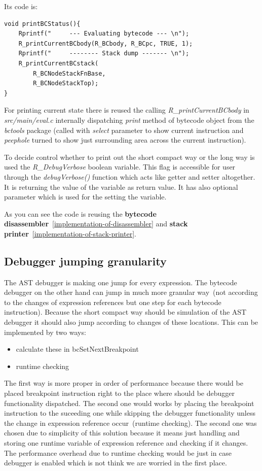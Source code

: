 \documentclass[thesis=M,english]{FITthesis}[2018/10/20]
\begin{document}
Its code is:
\begin{lstlisting}
void printBCStatus(){
    Rprintf("     --- Evaluating bytecode --- \n");
    R_printCurrentBCbody(R_BCbody, R_BCpc, TRUE, 1);
    Rprintf("     -------- Stack dump ------- \n");
    R_printCurrentBCstack(
    	R_BCNodeStackFnBase, 
    	R_BCNodeStackTop);
}
\end{lstlisting}

For printing current state there is reused the calling \textit{R{\_}printCurrentBCbody} in \textit{src/main/eval.c} internally dispatching \textit{print} method of bytecode object from the \textit{bctools} package (called with \textit{select} parameter to show current instruction and \textit{peephole} turned to show just surrounding area across the current instruction).

To decide control whether to print out the short compact way or the long way is used the \textit{R{\_}DebugVerbose} boolean variable. This flag is accessible for user through the \textit{debugVerbose()} function which acts like getter and setter altogether. It is returning the value of the variable as return value. It has also optional parameter which is used for the setting the variable. 

As you can see the code is reusing the \textbf{bytecode disassembler}~\ref{implementation-of-disassembler} and \textbf{stack printer}~\ref{implementation-of-stack-printer}.

\subsection{Debugger jumping granularity}\label{debugger-jumping-granuality}

The AST debugger is making one jump for every expression. The bytecode debugger on the other hand can jump in much more granular way~(not according to the changes of expression references but one step for each bytecode instruction). Because the short compact way should be simulation of the AST debugger it should also jump according to changes of these locations. This can be implemented by two ways:

\begin{itemize}
	\item calculate these in bcSetNextBreakpoint
	\item runtime checking
\end{itemize}

The first way is more proper in order of performance because there would be placed breakpoint instruction right to the place where should be debugger functionality dispatched. The second one would works by placing the breakpoint instruction to the suceeding one while skipping the debugger functionality unless the change in expression reference occur~(runtime checking). The second one was chosen due to simplicity of this solution because it means just handling and storing one runtime variable of expression reference and checking if it changes. The performance overhead due to runtime checking would be just in case debugger is enabled which is not think we are worried in the first place.
\end{document}
